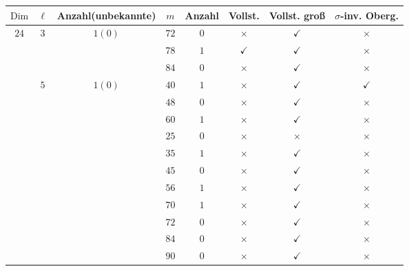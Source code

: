 \documentclass[12pt,a4paper,halfparskip,headsepline,bibtotocnumbered]{scrreprt}
\theoremstyle{nummermitklammern}
\theoremstyle{nonumberbreak}
\newcommand{\Dim}{\text{Dim}}
\begin{document}
\begin{table}[H]
	\centering
	\begin{tabular}{|c|c|c|c|c|c|c|c|}
		\hline		
		$\Dim$					&$\ell$					&{Anzahl(unbekannte)}		&$m$	&Anzahl	&Vollst.	&Vollst. groß	&$\sigma$-inv. Oberg.\\ \hline
		\multirow{14}{*}{$24$}	&\multirow{3}{*}{$3$}	&\multirow{3}{*}{$1(0)$}	&$72$	&$0$	&$\times$		&$\checkmark$	&$\times$\\ \cline{4-8}
								&						&							&$78$	&$1$	&$\checkmark$	&$\checkmark$	&$\times$\\ \cline{4-8}
								&						&							&$84$	&$0$	&$\times$		&$\checkmark$	&$\times$\\ \cline{2-8}
								&\multirow{11}{*}{$5$}	&\multirow{11}{*}{$1(0)$}	&$40$	&$1$	&$\times$		&$\checkmark$	&$\checkmark$\\ \cline{4-8}
								&						&							&$48$	&$0$	&$\times$		&$\checkmark$	&$\times$\\ \cline{4-8}
								&						&							&$60$	&$1$	&$\times$		&$\checkmark$	&$\times$\\ \cline{4-8}
								&						&							&$25$	&$0$	&$\times$		&$\times$		&$\times$\\ \cline{4-8}
								&						&							&$35$	&$1$	&$\times$		&$\checkmark$	&$\times$\\ \cline{4-8}
								&						&							&$45$	&$0$	&$\times$		&$\checkmark$	&$\times$\\ \cline{4-8}
								&						&							&$56$	&$1$	&$\times$		&$\checkmark$	&$\times$\\ \cline{4-8}
								&						&							&$70$	&$1$	&$\times$		&$\checkmark$	&$\times$\\ \cline{4-8}
								&						&							&$72$	&$0$	&$\times$		&$\checkmark$	&$\times$\\ \cline{4-8}
								&						&							&$84$	&$0$	&$\times$		&$\checkmark$	&$\times$\\ \cline{4-8}
								&						&							&$90$	&$0$	&$\times$		&$\checkmark$	&$\times$\\ \hline
	\end{tabular}
\end{table}
\end{document}
